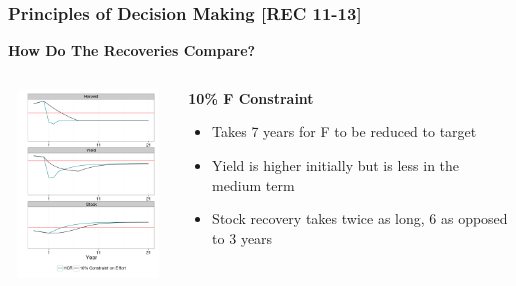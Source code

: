 \documentclass{beamer}
\newcommand\Fontviii{\fontsize{8}{10}\selectfont}
\begin{document}
\begin{frame}\frametitle{Principles of Decision Making [REC 11-13]} \smallskip\textbf{How Do The Recoveries Compare?}\smallskip\\ 
\begin{columns}[t] 
\begin{column}[T]{6cm}
  \includegraphics[height=50mm,width=50mm]{hcr-ts.png}
\end{column}
\begin{column}[T]{4cm} %
     \smallskip\textbf{10\% F Constraint}\smallskip\\
       \Fontviii
       \begin{itemize}%
          \item Takes 7 years for F to be reduced to target
          \item Yield is higher initially but is less in the medium term
          \item Stock recovery takes twice as long, 6 as opposed to 3 years
        \end{itemize}
\end{column}
\end{columns}    
\end{frame}
\end{document}
